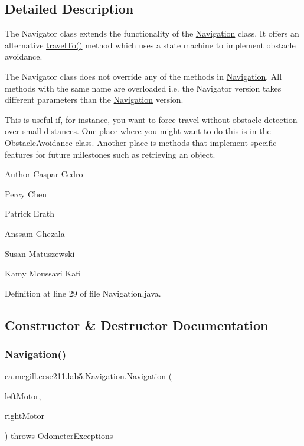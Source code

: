 \subsection{Detailed Description}
The Navigator class extends the functionality of the \hyperlink{classca_1_1mcgill_1_1ecse211_1_1lab5_1_1_navigation}{Navigation} class. It offers an alternative \hyperlink{classca_1_1mcgill_1_1ecse211_1_1lab5_1_1_navigation_a318969f4776d0bf4a8721be3d2444a5c}{travel\+To()} method which uses a state machine to implement obstacle avoidance.

The Navigator class does not override any of the methods in \hyperlink{classca_1_1mcgill_1_1ecse211_1_1lab5_1_1_navigation}{Navigation}. All methods with the same name are overloaded i.\+e. the Navigator version takes different parameters than the \hyperlink{classca_1_1mcgill_1_1ecse211_1_1lab5_1_1_navigation}{Navigation} version.

This is useful if, for instance, you want to force travel without obstacle detection over small distances. One place where you might want to do this is in the Obstacle\+Avoidance class. Another place is methods that implement specific features for future milestones such as retrieving an object.

\begin{DoxyAuthor}{Author}
Caspar Cedro 

Percy Chen 

Patrick Erath 

Anssam Ghezala 

Susan Matuszewski 

Kamy Moussavi Kafi 
\end{DoxyAuthor}


Definition at line 29 of file Navigation.\+java.



\subsection{Constructor \& Destructor Documentation}
\mbox{\label{classca_1_1mcgill_1_1ecse211_1_1lab5_1_1_navigation_a93b746f61226c3b14532c43d0c2f61dd}} 
\subsubsection{\texorpdfstring{Navigation()}{Navigation()}}
{\footnotesize\ttfamily ca.\+mcgill.\+ecse211.\+lab5.\+Navigation.\+Navigation (\begin{DoxyParamCaption}\item[{E\+V3\+Large\+Regulated\+Motor}]{left\+Motor,  }\item[{E\+V3\+Large\+Regulated\+Motor}]{right\+Motor }\end{DoxyParamCaption}) throws \hyperlink{classca_1_1mcgill_1_1ecse211_1_1odometer_1_1_odometer_exceptions}{Odometer\+Exceptions}}


